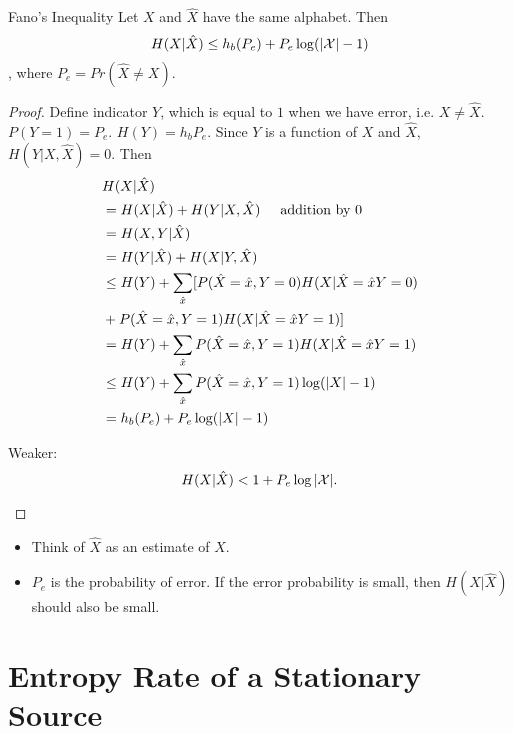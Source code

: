 \documentclass[../main.tex]{subfiles}
\begin{document}
\begin{bbox}{Fano's Inequality}
    Let $X$ and $\hat{X}$ have the same alphabet. Then \begin{equation*}
        H(X|\hat{X})\leq h_b(P_e) + P_e \log (|\mathcal{X}|-1)
    \end{equation*}, where $P_e = Pr(\hat{X}\neq X)$.
    \begin{proof}
        Define indicator $Y$, which is equal to $1$ when we have error, i.e. $X\neq \hat{X}$. $P(Y=1)=P_e$. $H(Y)=h_b{P_e}$. Since $Y$ is a function of $X$ and $\hat{X}$, $H(Y|X,\hat{X})=0$.
        Then \begin{align*}
            &H(X|\hat{X})\\
            &=H(X|\hat{X})+H(Y|X,\hat{X})\hspace{5mm}\text{addition by 0}\\
            &= H(X,Y | \hat{X})\\
            &= H(Y|\hat{X})+H(X|Y,\hat{X})\\
            &\leq H(Y) + \sum_{\hat{x}}[P(\hat{X}=\hat{x}, Y=0) H(X|\hat{X}=\hat{x}Y=0)\\
            &+P(\hat{X}=\hat{x}, Y=1) H(X|\hat{X}=\hat{x}Y=1)]\\
            &= H(Y) + \sum_{\hat{x}}P(\hat{X}=\hat{x}, Y=1) H(X|\hat{X}=\hat{x}Y=1)\\
            &\leq H(Y) + \sum_{\hat{x}}P(\hat{X}=\hat{x}, Y=1)\log (|X|-1)\\
            &= h_b(P_e)+P_e\log(|X|-1)
        \end{align*}
        \begin{corollary*}
            Weaker: \begin{equation*}
                H(X|\hat{X}) < 1+P_e\log |\mathcal{X}|.
            \end{equation*}
        \end{corollary*}
    \end{proof}
\end{bbox}
\begin{itemize}
    \item Think of $\hat{X}$ as an estimate of $X$. 
    \item $P_e$ is the probability of error. If the error probability is small, then $H(X|\hat{X})$ should also be small.
\end{itemize}

\section{Entropy Rate of a Stationary Source}
\end{document}
